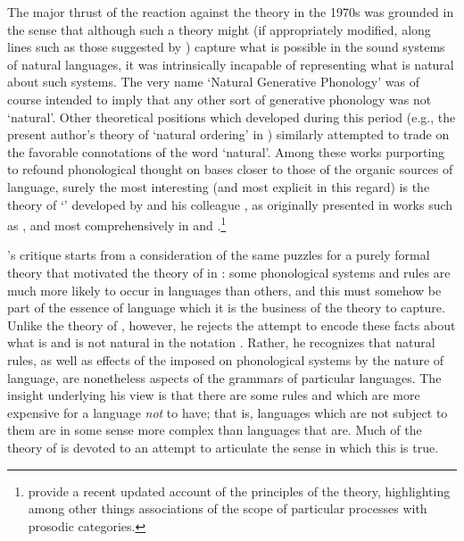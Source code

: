 The major thrust of the reaction against the \textsl{} theory in
the 1970s was grounded in the sense that although such a theory might
(if appropriately modified, along lines such as those suggested by
{\Kiparsky}) capture what is possible in the sound systems of natural
languages, it was intrinsically incapable of representing what is
natural about such systems. The very name `Natural Generative
Phonology' was of course intended to imply that any other sort of
generative phonology was not `natural'. Other theoretical positions
which developed during this period (e.g., the present author's theory
of `natural ordering' in \citealt{sra74:orgphon}) similarly attempted
to trade on the favorable connotations of the word `natural'. Among
these works purporting to refound phonological thought on bases closer
to those of the organic sources of language, surely the most
interesting (and most explicit in this regard) is the theory of
`' developed by  and his colleague
, as originally presented in works such as
\citealt{stampe68:yes.virginia,stampe69:acquisition}, and most
comprehensively in \citealt{stampe:thesis} and
\citealt{donegan.stampe79:study.of.np}.\footnote{\citet{donegan.stampe09:hypotheses}
  provide a recent updated account of the principles of the theory,
  highlighting among other things associations of the scope of
  particular processes with prosodic categories.}

{\Stampe}'s critique starts from a consideration of the same puzzles for
a purely formal theory that motivated the theory of  in
\textsl{}: some phonological systems and rules are much more likely
to occur in languages than others, and this must somehow be part of
the essence of language which it is the business of the theory to
capture. Unlike the  theory of \textsl{}, however, he
rejects the attempt to encode these facts about what is and is not
natural in the notation \citep{stampe73:chap9}. Rather, he recognizes
that natural rules, as well as effects of the  imposed on
phonological systems by the nature of language, are nonetheless
aspects of the grammars of particular languages. The insight
underlying his view is that there are some rules and  which
are more expensive for a language \textit{not} to have; that is,
languages which are not subject to them are in some sense more complex
than languages that are. Much of the theory of  is
devoted to an attempt to articulate the sense in which this is true.

